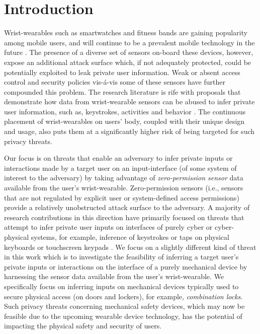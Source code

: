 \documentclass[]{IEEEtran}
\begin{document}

\IEEEpeerreviewmaketitle

\section{Introduction}
\label{intro}

Wrist-wearables such as smartwatches and fitness bands are gaining popularity among mobile users, and will continue to be a prevalent mobile technology in the future \cite{noauthor_wearables_nodate}. The presence of a diverse set of sensors on-board these devices, however, expose an additional attack surface which, if not adequately protected, could be potentially exploited to leak private user information. Weak or absent access control and security policies vis-\'{a}-vis some of these sensors have further compounded this problem. The research literature is rife with proposals that demonstrate how data from wrist-wearable sensors can be abused to infer private user information, such as, keystrokes, activities and behavior  \cite{maiti2015,wang2015,liu2015good,maiti2016smartwatch,wang2016friend,shoaib2016complex,xu2015finger,wen2016serendipity,karatas2016leveraging}. 
The continuous placement of wrist-wearables on users' body, coupled with their unique design and usage, also puts them at a significantly higher risk of being targeted for such privacy threats.

Our focus is on threats that enable an adversary to infer private inputs or interactions made by a target user on an input-interface (of some system of interest to the adversary) by taking advantage of \emph{zero-permission sensor} data available from the user's wrist-wearable. Zero-permission sensors (i.e., sensors that are not regulated by explicit user or system-defined access permissions) provide a relatively unobstructed attack surface to the adversary. A majority of research contributions in this direction have primarily focused on threats that attempt to infer private user inputs on interfaces of purely cyber or cyber-physical systems, for example, inference of keystrokes or taps on physical keyboards or touchscreen keypads  \cite{maiti2015,wang2015,liu2015good,maiti2016smartwatch,wang2016friend,holmes2016luxleak}. We focus on a slightly different kind of threat in this work which is to investigate the feasibility of inferring a target user's private inputs or interactions on the interface of a purely mechanical device by harnessing the sensor data available from the user's wrist-wearable. 
We specifically focus on inferring inputs on mechanical devices typically used to secure physical access (on doors and lockers), for example, \emph{combination locks}. 
Such privacy threats concerning mechanical safety devices, which may now be feasible due to the upcoming wearable device technology, has the potential of impacting the physical safety and security of users. 
\end{document}

